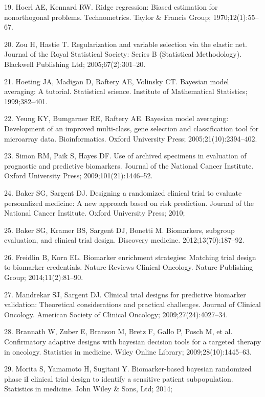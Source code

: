\documentclass[11pt]{article}
\begin{document}
19. Hoerl AE, Kennard RW. Ridge regression: Biased estimation for
nonorthogonal problems. Technometrics. Taylor \& Francis Group;
1970;12(1):55--67.

20. Zou H, Hastie T. Regularization and variable selection via the
elastic net. Journal of the Royal Statistical Society: Series B
(Statistical Methodology). Blackwell Publishing Ltd; 2005;67(2):301--20.

21. Hoeting JA, Madigan D, Raftery AE, Volinsky CT. Bayesian model
averaging: A tutorial. Statistical science. Institute of Mathematical
Statistics; 1999;382--401.

22. Yeung KY, Bumgarner RE, Raftery AE. Bayesian model averaging:
Development of an improved multi-class, gene selection and
classification tool for microarray data. Bioinformatics. Oxford
University Press; 2005;21(10):2394--402.

23. Simon RM, Paik S, Hayes DF. Use of archived specimens in evaluation
of prognostic and predictive biomarkers. Journal of the National Cancer
Institute. Oxford University Press; 2009;101(21):1446--52.

24. Baker SG, Sargent DJ. Designing a randomized clinical trial to
evaluate personalized medicine: A new approach based on risk prediction.
Journal of the National Cancer Institute. Oxford University Press; 2010;

25. Baker SG, Kramer BS, Sargent DJ, Bonetti M. Biomarkers, subgroup
evaluation, and clinical trial design. Discovery medicine.
2012;13(70):187--92.

26. Freidlin B, Korn EL. Biomarker enrichment strategies: Matching trial
design to biomarker credentials. Nature Reviews Clinical Oncology.
Nature Publishing Group; 2014;11(2):81--90.

27. Mandrekar SJ, Sargent DJ. Clinical trial designs for predictive
biomarker validation: Theoretical considerations and practical
challenges. Journal of Clinical Oncology. American Society of Clinical
Oncology; 2009;27(24):4027--34.

28. Brannath W, Zuber E, Branson M, Bretz F, Gallo P, Posch M, et al.
Confirmatory adaptive designs with bayesian decision tools for a
targeted therapy in oncology. Statistics in medicine. Wiley Online
Library; 2009;28(10):1445--63.

29. Morita S, Yamamoto H, Sugitani Y. Biomarker-based bayesian
randomized phase iI clinical trial design to identify a sensitive
patient subpopulation. Statistics in medicine. John Wiley \& Sons, Ltd;
2014;
\end{document}
